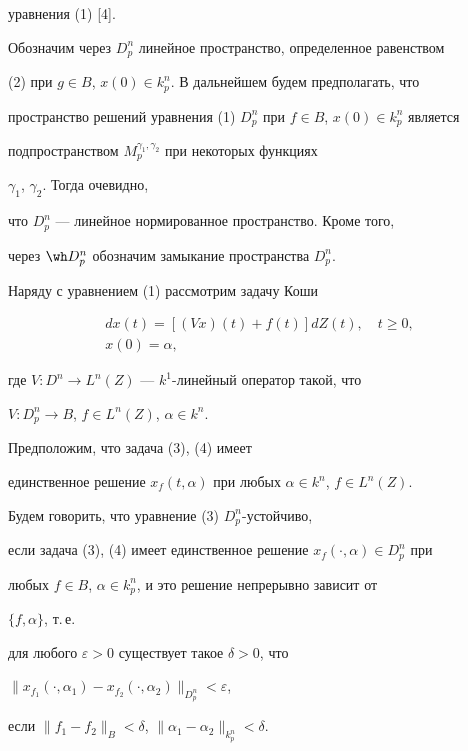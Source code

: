 уравнения (1) [4]. 


 


Обозначим через $D^n_p$ линейное пространство, определенное равенством 


(2) при $g\in B$, $x(0)\in k^n_p$. В дальнейшем будем предполагать, что 


пространство решений уравнения (1) $D^n_p$ при $f\in B$, $x(0)\in 


k^n_p$ является 


подпространством $M^{\gamma_1,\gamma_2}_p$ при некоторых функциях 


$\gamma_1$, $\gamma_2$. Тогда очевидно, 


что $D^n_p$ --- линейное нормированное пространство. Кроме того, 


через $\wh D^n_p$ обозначим замыкание пространства $D^n_p$. 


 


Наряду с уравнением (1) рассмотрим задачу Коши 


\begin{gather} 


d x(t)=[(V x)(t)+f(t)]d Z(t),\quad t\ge0,\\ 


x(0)=\alpha, 


\end{gather} 


где $V:D^n\to L^n(Z)$ --- $k^1$-линейный оператор такой, что 


$V:D^n_p\to B$, $f\in L^n(Z)$, $\alpha\in k^n$. 


 


Предположим, что задача (3), (4) имеет 


единственное решение $x_f(t,\alpha)$ при любых $\alpha\in k^n$, $f\in 


L^n(Z)$. 


 


\begin{defn} 


Будем говорить, что уравнение (3) $D^n_p$-устойчиво, 


если задача (3), (4) имеет единственное решение $x_f(\cdot,\alpha)\in 


D^n_p$ при 


любых $f\in B$, $\alpha\in k^n_p$, и это решение непрерывно зависит от 


$\{f,\alpha\}$, т.\,е. 


для любого $\varepsilon>0$ существует такое $\delta>0$, что 


$\|x_{f_1}(\cdot,\alpha_1)-x_{f_2}(\cdot,\alpha_2)\|_{D^n_p}< 


\varepsilon$, 


если $\|f_1-f_2\|_B<\delta$, $\|\alpha_1-\alpha_2\|_{k^n_p}<\delta$. 


\end{defn} 


